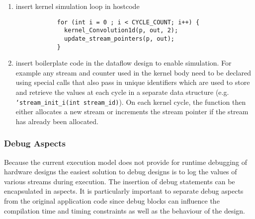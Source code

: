 \begin{enumerate}

\item insert kernel simulation loop in hostcode %
  \begin{figure}[!h]
    \begin{lstlisting}
      for (int i = 0 ; i < CYCLE_COUNT; i++) {
        kernel_Convolution1d(p, out, 2);
        update_stream_pointers(p, out);
      }
    \end{lstlisting}
  \end{figure}

\item insert boilerplate code in the dataflow design to enable simulation.
  For example any stream and counter used in the kernel body need to
  be declared using special calls that also pass in unique identifiers
  which are used to store and retrieve the values at each cycle in a
  separate data structure (e.g. \texttt{`stream\_init\_i(int
    stream\_id)}). On each kernel cycle, the function then either
  allocates a new stream or increments the stream pointer if the
  stream has already been allocated.
  \begin{comment}
    \begin{figure}[!h]
      \begin{lstlisting}
        float* i4 = count_i(1000, 1, 0);
        float* i1 = countChain_i(n1, 1, i4, 0);
      \end{lstlisting}
      \caption{Applying the simulation aspect to the dataflow design in
        Figure \ref{fig:maxc-1dconv}}
      \label{fig:maxc-sim-aspect}
    \end{figure}
  \end{comment}

\end{enumerate}

\lstset{style=MaxC}


\subsubsection{Debug Aspects}

Because the current execution model does not provide for runtime
debugging of hardware designs the easiest solution to debug designs is
to log the values of various streams during execution. The insertion
of debug statements can be encapsulated in aspects. It is particularly
important to separate debug aspects from the original application code
since debug blocks can influence the compilation time and timing
constraints as well as the behaviour of the design.

